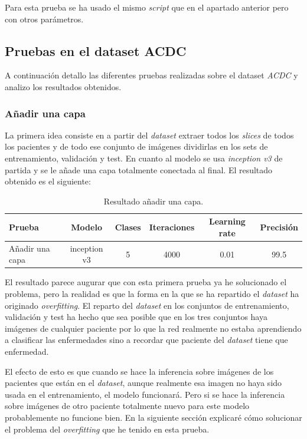 \documentclass[12pt,a4paper]{article}
\begin{document}
Para esta prueba se ha usado el mismo \textit{script} que en el apartado anterior pero con otros parámetros.

\subsection{Pruebas en el dataset ACDC}
A continuación detallo las diferentes pruebas realizadas sobre el dataset \textit{ACDC} y analizo los resultados obtenidos.

\subsubsection{Añadir una capa}
La primera idea consiste en a partir del \textit{dataset} extraer todos los \textit{slices} de todos los pacientes y de todo ese conjunto de imágenes dividirlas en los sets de entrenamiento, validación y test. En cuanto al modelo se usa \textit{inception v3} de partida y se le añade una capa totalmente conectada al final. El resultado obtenido es el siguiente:

\begin{table}[H]
\centering
\begin{tabular}{|l|c|c|c|c|c|}
\hline
\textbf{Prueba} & \textbf{Modelo} & \textbf{Clases} & \textbf{Iteraciones} & \textbf{Learning rate} & \textbf{Precisión} \\ \hline
Añadir una capa & inception v3    & 5               & 4000                 & 0.01                   & 99.5               \\ \hline
\end{tabular}
\caption{Resultado añadir una capa.}
\end{table}

El resultado parece augurar que con esta primera prueba ya he solucionado el problema, pero la realidad es que la forma en la que se ha repartido el \textit{dataset} ha originado \textit{overfitting}. El reparto del \textit{dataset} en los conjuntos de entrenamiento, validación y test ha hecho que sea posible que en los tres conjuntos haya imágenes de cualquier paciente por lo que la red realmente no estaba aprendiendo a clasificar las enfermedades sino a recordar que paciente del \textit{dataset} tiene que enfermedad.
\bigskip

El efecto de esto es que cuando se hace la inferencia sobre imágenes de los pacientes que están en el \textit{dataset}, aunque realmente esa imagen no haya sido usada en el entrenamiento, el modelo funcionará. Pero si se hace la inferencia sobre imágenes de otro paciente totalmente nuevo para este modelo probablemente no funcione bien. En la siguiente sección explicaré cómo solucionar el problema del \textit{overfitting} que he tenido en esta prueba.
\bigskip
\end{document}
